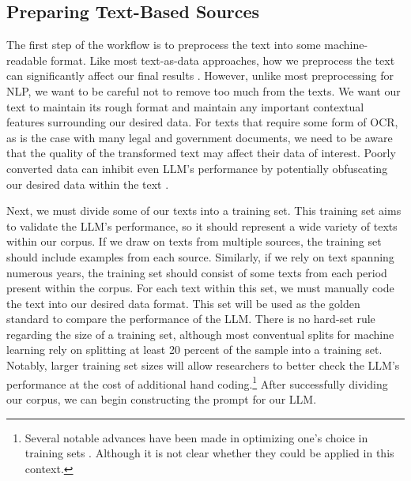    \subsection{Preparing Text-Based Sources}
    The first step of the workflow is to preprocess the text into some machine-readable format. Like most text-as-data approaches, how we preprocess the text can significantly affect our final results \citep{grimmer2022text,wilkersonLargeScaleComputerizedText2017}. However, unlike most preprocessing for NLP, we want to be careful not to remove too much from the texts. We want our text to maintain its rough format and maintain any important contextual features surrounding our desired data. For texts that require some form of OCR, as is the case with many legal and government documents, we need to be aware that the quality of the transformed text may affect their data of interest. Poorly converted data can inhibit even LLM's performance by potentially obfuscating our desired data within the text \citep{vanstrienAssessingImpactOCR2020}. 

    Next, we must divide some of our texts into a training set. This training set aims to validate the LLM's performance, so it should represent a wide variety of texts within our corpus. If we draw on texts from multiple sources, the training set should include examples from each source. Similarly, if we rely on text spanning numerous years, the training set should consist of some texts from each period present within the corpus. For each text within this set, we must manually code the text into our desired data format. This set will be used as the golden standard to compare the performance of the LLM. There is no hard-set rule regarding the size of a training set, although most conventual splits for machine learning rely on splitting at least 20 percent of the sample into a training set. Notably, larger training set sizes will allow researchers to better check the LLM's performance at the cost of additional hand coding.\footnote{Several notable advances have been made in optimizing one's choice in training sets \citep{kaufmanSelectingMoreInformative2024}. Although it is not clear whether they could be applied in this context.} After successfully dividing our corpus, we can begin constructing the prompt for our LLM.


